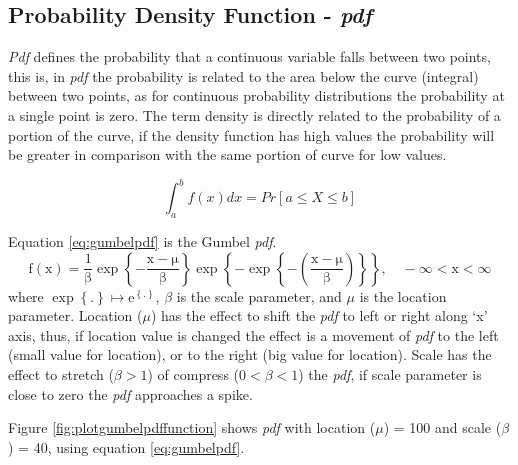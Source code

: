 \documentclass[12pt,oneside]{reedthesis}
\begin{document}
\hypertarget{probability-density-function---pdf}{%
\subsection{\texorpdfstring{Probability Density Function - \emph{pdf}}{Probability Density Function - pdf}}\label{probability-density-function---pdf}}

\emph{Pdf} defines the probability that a continuous variable falls between two points, this is, in \emph{pdf} the probability is related to the area below the curve (integral) between two points, as for continuous probability distributions the probability at a single point is zero. The term density is directly related to the probability of a portion of the curve, if the density function has high values the probability will be greater in comparison with the same portion of curve for low values.

\[
\int_a^b f(x)dx = Pr[a \leq X \leq b]
\]

Equation \eqref{eq:gumbelpdf} is the Gumbel \emph{pdf}.
\begin{equation}
  \mathrm{
          f(x)=\frac{1}{\beta}
          \exp\left\{
            -\frac{x-\mu}{\beta}
          \right\}
          \exp\left\{
            -\exp\left\{
              -\left(
                \frac{x-\mu}{\beta}
              \right)
            \right\}
          \right\},
          \quad -\infty < x < \infty
         }
  \label{eq:gumbelpdf}
\end{equation}
where \(\exp\left\{.\right\} \mapsto \mathrm{e}^{\left\{.\right\}}\), \(\beta\) is the scale parameter, and \(\mu\) is the location parameter. Location (\(\mu\)) has the effect to shift the \emph{pdf} to left or right along `x' axis, thus, if location value is changed the effect is a movement of \emph{pdf} to the left (small value for location), or to the right (big value for location). Scale has the effect to stretch (\(\beta > 1\)) of compress (\(0 < \beta< 1\)) the \emph{pdf}, if scale parameter is close to zero the \emph{pdf} approaches a spike.

Figure \ref{fig:plotgumbelpdffunction} shows \emph{pdf} with location (\(\mu\)) = 100 and scale (\(\beta\)) = 40, using equation \eqref{eq:gumbelpdf}.
\end{document}
